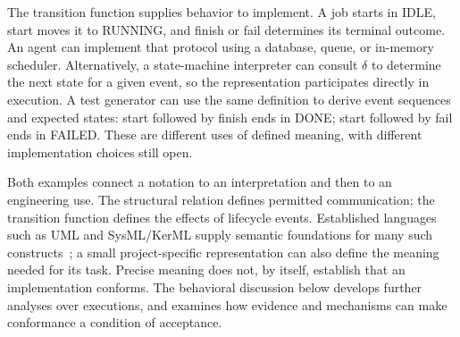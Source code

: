 The transition function supplies behavior to implement. A job starts in IDLE, start moves it to RUNNING, and finish or fail determines its terminal outcome. An agent can implement that protocol using a database, queue, or in-memory scheduler. Alternatively, a state-machine interpreter can consult \(\delta\) to determine the next state for a given event, so the representation participates directly in execution. A test generator can use the same definition to derive event sequences and expected states: start followed by finish ends in DONE; start followed by fail ends in FAILED. These are different uses of defined meaning, with different implementation choices still open.

Both examples connect a notation to an interpretation and then to an engineering use. The structural relation defines permitted communication; the transition function defines the effects of lifecycle events. Established languages such as UML and SysML/KerML supply semantic foundations for many such constructs~\citep{omg2017uml,omg2025sysml,omg2025kerml}; a small project-specific representation can also define the meaning needed for its task. Precise meaning does not, by itself, establish that an implementation conforms. The behavioral discussion below develops further analyses over executions, and  examines how evidence and mechanisms can make conformance a condition of acceptance.





